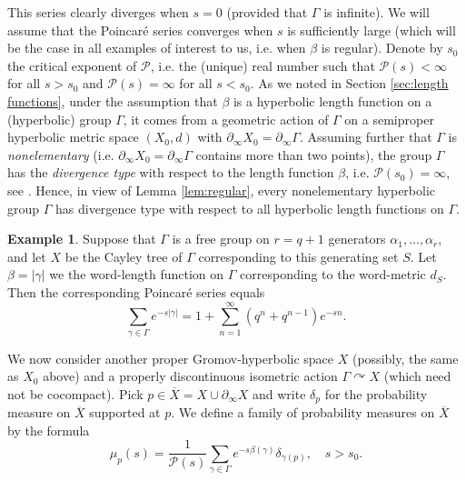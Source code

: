 \documentclass[12pt]{amsbook}%
\theoremstyle{definition}
\newtheorem{example}[thm]{Example}
\theoremstyle{remark}
\numberwithin{section}{chapter}
\numberwithin{subsection}{section}
\numberwithin{figure}{chapter}
\DeclareMathOperator{\acts}{\curvearrowright}
\def\cP{{\mathscr{P}}}
\def\Ga{\Gamma}
\def\ga{\gamma}
\def\al{\alpha}
\def\geo{\partial_\infty}
\begin{document}
{{This series clearly diverges when $s=0$ (provided that $\Ga$ is infinite). We will assume that the Poincar\'e series converges when $s$ is sufficiently large (which will be the case in all examples of interest to us, i.e. when $\beta$ is regular). Denote by $s_0$ the critical exponent of $\cP$, i.e. the (unique) real number such that $\cP(s)<\infty$ for all $s> s_0$ and $\cP(s)=\infty$ for all $s<s_0$.  
As we noted in Section \ref{sec:length functions}, under the assumption that $\beta$ is a hyperbolic length function on a 
(hyperbolic) group $\Ga$, it  
 comes from a geometric action of $\Ga$ on a semiproper hyperbolic metric space $(X_0,d)$ with $\geo X_0=\geo \Gamma$. Assuming further that $\Ga$ is {\em nonelementary}  (i.e. $\geo X_0=\geo \Ga$ contains more than two points), the group $\Gamma$ has the {\em divergence type} with respect to the length function $\beta$, i.e. $\cP(s_0)=\infty$, see \cite[Corollaire 7.3]{Coo93}. Hence, in view of Lemma \ref{lem:regular}, every nonelementary hyperbolic group $\Ga$ has divergence type with respect to all hyperbolic length functions on $\Ga$. 

\begin{example}\label{ex:Free}
Suppose that $\Ga$ is a free group on $r=q+1$ generators $\al_1,...,\al_r$, and let $X$ be the Cayley tree of $\Ga$ corresponding to this generating set $S$. Let $\beta=|\ga|$ we the word-length function on $\Ga$ corresponding to the word-metric $d_S$. Then  the corresponding   Poincar\'e series equals 
\begin{equation}
\label{eq:Pser}
\sum_{\ga\in\Ga} e^{-s|\ga|}= 1+ \sum_{n=1}^\infty (q^{n}+q^{n-1})e^{-sn}. 
\end{equation}
\end{example}



We now consider another proper Gromov-hyperbolic space $X$ (possibly, the same as $X_0$ above) and a properly discontinuous isometric action $\Ga\acts X$ (which need not be cocompact). 
Pick $p\in \overline{X}= X\cup \geo X$ and write $\delta_p$ for the probability measure on $\overline{X}$ supported at $p$. 
We define a family of probability measures on $\overline{X}$ by the  formula
 \begin{equation}
\mu_{p}(s) = \frac{1}{\cP(s)}\sum_{\gamma\in \Gamma}e^{-s\beta(\gamma)}\delta_{\gamma(p)}, \quad s> s_0. 
 \end{equation}

}}
\end{document}

